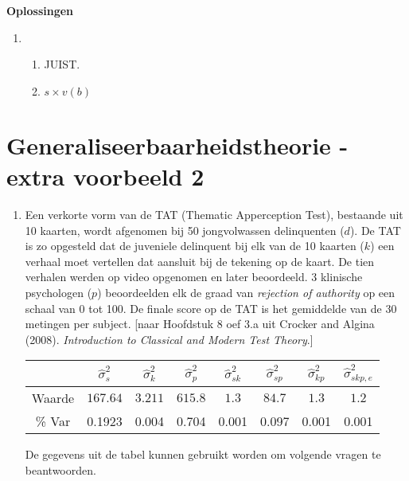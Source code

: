 \OPLOSSING
{
\textbf{Oplossingen}
\begin{enumerate}

\item
\begin{enumerate}
\item JUIST.
\item $s \times v(b)$

\end{enumerate} 


\end{enumerate}
}


\OPGAVE
{
\section{Generaliseerbaarheidstheorie - extra voorbeeld 2}

\begin{enumerate}

\item
Een verkorte vorm van de TAT (Thematic Apperception Test), bestaande uit 10 kaarten, wordt afgenomen bij 50
jongvolwassen delinquenten ($d$). 
De TAT is zo opgesteld dat de juveniele delinquent bij elk van de 10 kaarten ($k$) een verhaal moet vertellen dat aansluit bij de tekening op de kaart.
De tien verhalen werden op video opgenomen en later beoordeeld.
3 klinische psychologen ($p$) beoordeelden elk de graad van \emph{rejection of authority} op een schaal van 0 tot 100. 
De finale score op de TAT is het gemiddelde van de 30 metingen per subject.
[naar Hoofdstuk 8 oef 3.a uit Crocker and Algina (2008). \emph{Introduction to Classical and Modern Test Theory}.]

\begin{center}
\renewcommand{\arraystretch}{1.2}
\begin{tabular}{|c|c|c|c|c|c|c|c|} \hline
 & $ \hat{\sigma}^2_{s} $ & $ \hat{\sigma}^2_{k} $& $ \hat{\sigma}^2_{p} $ & $ \hat{\sigma}^2_{sk} $ & $ \hat{\sigma}^2_{sp} $ & $ \hat{\sigma}^2_{kp} $ & $ \hat{\sigma}^2_{skp,e} $ \\ \hline
Waarde  & $ 167.64 $ & $ 3.211 $ & $615.8 $ & $ 1.3 $ & $ 84.7 $ & $ 1.3 $ & $ 1.2 $ \\ 
\% Var & 0.1923& 0.004& 0.704& 0.001& 0.097& 0.001& 0.001 \\ \hline
\end{tabular}
\end{center}

\normalsize
De gegevens uit de tabel kunnen gebruikt worden om volgende vragen te beantwoorden.


\end{enumerate}}
